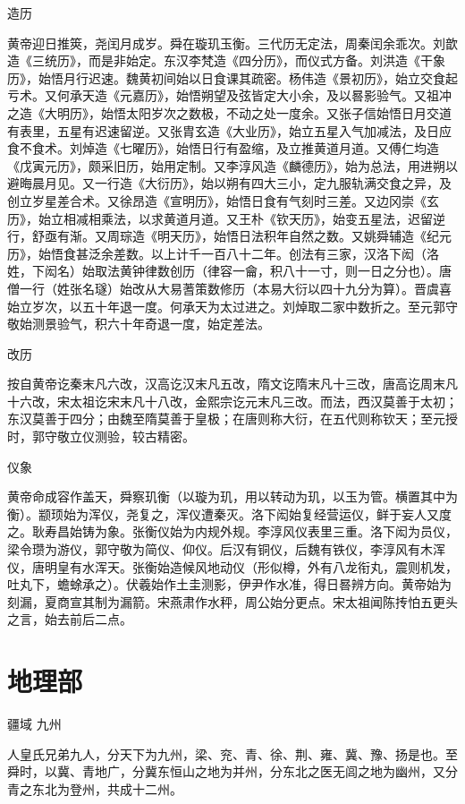 \documentclass[a4paper,12pt,UTF8,twoside]{ctexbook}
\begin{document}
	造历
	
	黄帝迎日推筴，尧闰月成岁。舜在璇玑玉衡。三代历无定法，周秦闰余乖次。刘歆造《三统历》，而是非始定。东汉李梵造《四分历》，而仪式方备。刘洪造《干象历》，始悟月行迟速。魏黄初间始以日食课其疏密。杨伟造《景初历》，始立交食起亏术。又何承天造《元嘉历》，始悟朔望及弦皆定大小余，及以晷影验气。又祖冲之造《大明历》，始悟太阳岁次之数极，不动之处一度余。又张子信始悟日月交道有表里，五星有迟速留逆。又张胄玄造《大业历》，始立五星入气加减法，及日应食不食术。刘焯造《七曜历》，始悟日行有盈缩，及立推黄道月道。又傅仁均造《戊寅元历》，颇采旧历，始用定制。又李淳风造《麟德历》，始为总法，用进朔以避晦晨月见。又一行造《大衍历》，始以朔有四大三小，定九服轨满交食之异，及创立岁星差合术。又徐昂造《宣明历》，始悟日食有气刻时三差。又边冈崇《玄历》，始立相减相乘法，以求黄道月道。又王朴《钦天历》，始变五星法，迟留逆行，舒亟有渐。又周琮造《明天历》，始悟日法积年自然之数。又姚舜辅造《纪元历》，始悟食甚泛余差数。以上计千一百八十二年。创法有三家，汉洛下闳（洛姓，下闳名）始取法黄钟律数创历（律容一龠，积八十一寸，则一日之分也）。唐僧一行（姓张名璲）始改从大易蓍策数修历（本易大衍以四十九分为算）。晋虞喜始立岁次，以五十年退一度。何承天为太过进之。刘焯取二家中数折之。至元郭守敬始测景验气，积六十年奇退一度，始定差法。
	
	改历
	
	按自黄帝讫秦末凡六改，汉高讫汉末凡五改，隋文讫隋末凡十三改，唐高讫周末凡十六改，宋太祖讫宋末凡十八改，金熙宗讫元末凡三改。而法，西汉莫善于太初；东汉莫善于四分；由魏至隋莫善于皇极；在唐则称大衍，在五代则称钦天；至元授时，郭守敬立仪测验，较古精密。
	
	仪象
	
	黄帝命成容作盖天，舜察玑衡（以璇为玑，用以转动为玑，以玉为管。横置其中为衡）。颛顼始为浑仪，尧复之，浑仪遭秦灭。洛下闳始复经营运仪，鲜于妄人又度之。耿寿昌始铸为象。张衡仪始为内规外规。李淳风仪表里三重。洛下闳为员仪，梁令瓒为游仪，郭守敬为简仪、仰仪。后汉有铜仪，后魏有铁仪，李淳风有木浑仪，唐明皇有水浑天。张衡始造候风地动仪（形似樽，外有八龙衔丸，震则机发，吐丸下，蟾蜍承之）。伏羲始作土圭测影，伊尹作水准，得日晷辨方向。黄帝始为刻漏，夏商宣其制为漏箭。宋燕肃作水秤，周公始分更点。宋太祖闻陈抟怕五更头之言，始去前后二点。
	
	\part{地理部}
	疆域
	九州
	
	人皇氏兄弟九人，分天下为九州，梁、兖、青、徐、荆、雍、冀、豫、扬是也。至舜时，以冀、青地广，分冀东恒山之地为并州，分东北之医无闾之地为幽州，又分青之东北为登州，共成十二州。
	
\end{document}
